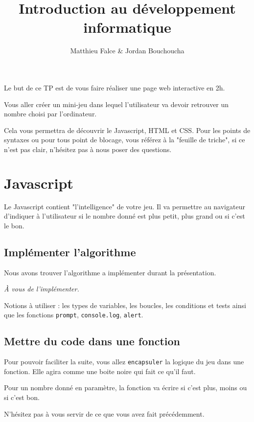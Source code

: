 \documentclass{article} %
\title{Introduction au développement informatique}
\author{Matthieu Falce \& Jordan Bouchoucha}
\begin{document}
\maketitle

Le but de ce TP est de vous faire réaliser une page web interactive en 2h. 

Vous aller créer un mini-jeu dans lequel l'utilisateur va devoir retrouver un nombre choisi par l'ordinateur.

Cela vous permettra de découvrir le Javascript, HTML et CSS. Pour les points de syntaxes ou pour tous point de blocage, vous référez à la "feuille de triche", si ce n'est pas clair, n'hésitez pas à nous poser des questions.

\section{Javascript}

Le Javascript contient "l'intelligence" de votre jeu. Il va permettre au navigateur d'indiquer à l'utilisateur si le nombre donné est plus petit, plus grand ou si c'est le bon. 

\subsection{Implémenter l'algorithme}

Nous avons trouver l'algorithme a implémenter durant la présentation. 

\begin{center}
	\emph{\`A vous de l'implémenter. }
\end{center}

Notions à utiliser : les types de variables, les boucles, les conditions et tests ainsi que les fonctions \texttt{prompt}, \texttt{console.log}, \texttt{alert}.

\subsection{Mettre du code dans une fonction}

Pour pouvoir faciliter la suite, vous allez \texttt{encapsuler} la logique du jeu dans une fonction. Elle agira comme une boite noire qui fait ce qu'il faut. 

Pour un nombre donné en paramètre, la fonction va écrire si c'est plus, moins ou si c'est bon. 

N'hésitez pas à vous servir de ce que vous avez fait précédemment. 
\end{document}

